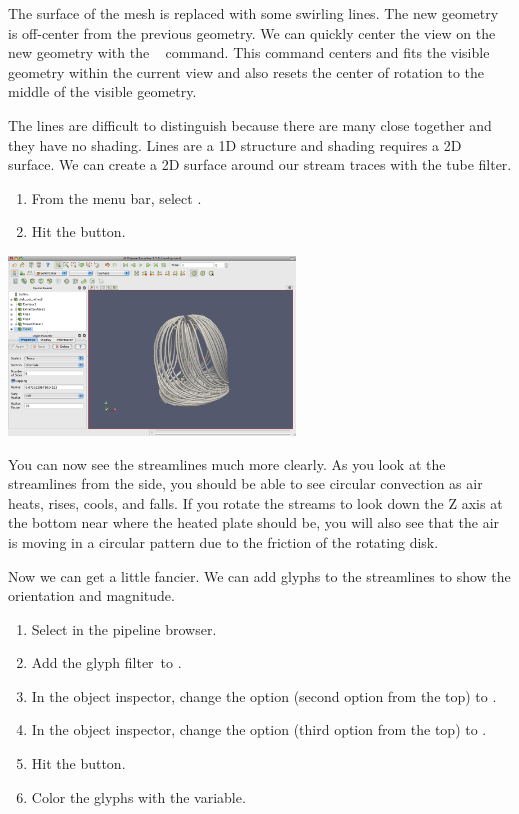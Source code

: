 The surface of the mesh is replaced with some swirling lines.  The new
geometry is off-center from the previous geometry.  We can quickly center
the view on the new geometry with the ~\resetCamera
command.  This command centers and fits the visible geometry within the
current view and also resets the center of rotation to the middle of the
visible geometry.

The lines are difficult to distinguish because there are many close
together and they have no shading.  Lines are a 1D structure and shading
requires a 2D surface.  We can create a 2D surface around our stream traces
with the tube filter.

\begin{enumerate}
  \restorecounter
\item From the menu bar, select  \ra {} \ra
  . 
\item Hit the \apply button.
\end{enumerate}

\begin{inlinefig}
  \includegraphics[width=3in]{images/StreamTracer1}
\end{inlinefig}

You can now see the streamlines much more clearly.  As you look at the
streamlines from the side, you should be able to see circular convection as
air heats, rises, cools, and falls.  If you rotate the streams to look down
the Z axis at the bottom near where the heated plate should be, you will
also see that the air is moving in a circular pattern due to the friction
of the rotating disk.

Now we can get a little fancier.  We can add glyphs to the streamlines to
show the orientation and magnitude.

\begin{enumerate}
\item Select  in the pipeline browser.
\item Add the glyph filter~\glyph to .
\item In the object inspector, change the  option (second
  option from the top) to .
\item In the object inspector, change the  option (third
  option from the top) to .
\item Hit the \apply button.
\item Color the glyphs with the  variable.
\end{enumerate}

